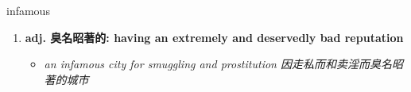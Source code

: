 
\begin{frame}
{\huge infamous}
\begin{center}
\begin{enumerate}\Large
  \item \textbf{adj. 臭名昭著的: having an extremely and deservedly bad reputation}
  \begin{itemize}
    \item \em{\Large{an infamous city for smuggling and prostitution 因走私而和卖淫而臭名昭著的城市}}
  \end{itemize}
\end{enumerate}
\end{center}
\end{frame}
